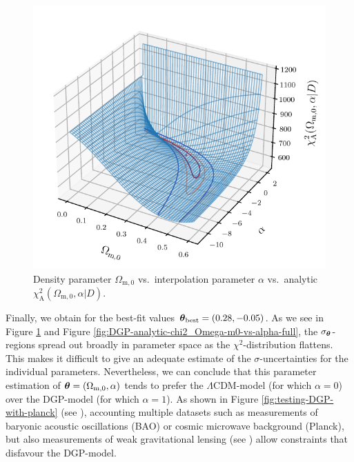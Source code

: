 \begin{figure}[H]
    \centering
    \includegraphics[scale=1.0]{figures/plots/PDF/DGP-analytic-chi2_Omega-m0-vs-alpha-vs-chi2.pdf}
    \caption{Density parameter $\Omega_{\text{m},0}$ vs.\ interpolation parameter $\alpha$ vs.\ analytic $\chi_{\text{A}}^2(\Omega_{\text{m},0}, \alpha \vert D)$.}
    \label{fig:DGP-analytic-chi2_Omega-m0-vs-alpha-vs-chi2}
\end{figure}

\noindent Finally, we obtain for the best-fit values $\vb*{\theta}_{\text{best}} = (0.28, -0.05)$. 
As we see in Figure \ref{fig:DGP-analytic-chi2_Omega-m0-vs-alpha-vs-chi2} and Figure \ref{fig:DGP-analytic-chi2_Omega-m0-vs-alpha-full}, the $\sigma_{\vb*{\theta}}$-regions spread out broadly in parameter space as the $\chi^2$-distribution flattens. This makes it difficult to give an adequate estimate of the $\sigma$-uncertainties for the individual parameters. Nevertheless, we can conclude that this parameter estimation of $\vb*{\theta} = (\Omega_{\text{m},0}, \alpha)$ tends to prefer the $\Lambda$CDM-model (for which $\alpha = 0$) over the DGP-model (for which $\alpha = 1$). As shown in Figure \ref{fig:testing-DGP-with-planck} (see \cite[Figure 3]{Li2013}), accounting multiple datasets such as measurements of baryonic acoustic oscillations (BAO) or cosmic microwave background (Planck), but also measurements of weak gravitational lensing (see \cite[Figure 7]{Thomas2009}) allow constraints that disfavour the DGP-model.

